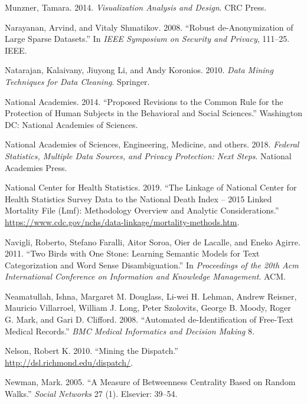 \documentclass[]{krantz}
\begin{document}
\hypertarget{ref-munzner2014visualization}{}
Munzner, Tamara. 2014. \emph{Visualization Analysis and Design}. CRC
Press.

\hypertarget{ref-narayanan2008robust}{}
Narayanan, Arvind, and Vitaly Shmatikov. 2008. ``Robust de-Anonymization
of Large Sparse Datasets.'' In \emph{IEEE Symposium on Security and
Privacy}, 111--25. IEEE.

\hypertarget{ref-natarajan2010data}{}
Natarajan, Kalaivany, Jiuyong Li, and Andy Koronios. 2010. \emph{Data
Mining Techniques for Data Cleaning}. Springer.

\hypertarget{ref-NationalAcademies2014}{}
National Academies. 2014. ``Proposed Revisions to the Common Rule for
the Protection of Human Subjects in the Behavioral and Social
Sciences.'' Washington DC: National Academies of Sciences.

\hypertarget{ref-national2018federal}{}
National Academies of Sciences, Engineering, Medicine, and others. 2018.
\emph{Federal Statistics, Multiple Data Sources, and Privacy Protection:
Next Steps}. National Academies Press.

\hypertarget{ref-NCHS2019}{}
National Center for Health Statistics. 2019. ``The Linkage of National
Center for Health Statistics Survey Data to the National Death Index --
2015 Linked Mortality File (Lmf): Methodology Overview and Analytic
Considerations.''
\url{https://www.cdc.gov/nchs/data-linkage/mortality-methods.htm}.

\hypertarget{ref-navigli-11}{}
Navigli, Roberto, Stefano Faralli, Aitor Soroa, Oier de Lacalle, and
Eneko Agirre. 2011. ``Two Birds with One Stone: Learning Semantic Models
for Text Categorization and Word Sense Disambiguation.'' In
\emph{Proceedings of the 20th Acm International Conference on
Information and Knowledge Management}. ACM.

\hypertarget{ref-Neamatullah2008}{}
Neamatullah, Ishna, Margaret M. Douglass, Li-wei H. Lehman, Andrew
Reisner, Mauricio Villarroel, William J. Long, Peter Szolovits, George
B. Moody, Roger G. Mark, and Gari D. Clifford. 2008. ``Automated
de-Identification of Free-Text Medical Records.'' \emph{BMC Medical
Informatics and Decision Making} 8.

\hypertarget{ref-nelson-10}{}
Nelson, Robert K. 2010. ``Mining the Dispatch.''
\url{http://dsl.richmond.edu/dispatch/}.

\hypertarget{ref-newman2005measure}{}
Newman, Mark. 2005. ``A Measure of Betweenness Centrality Based on
Random Walks.'' \emph{Social Networks} 27 (1). Elsevier: 39--54.
\end{document}
